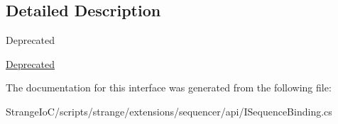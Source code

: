 \subsection{Detailed Description}
\begin{DoxyRefDesc}{Deprecated}
\item[\hyperlink{deprecated__deprecated000001}{Deprecated}]\end{DoxyRefDesc}


The documentation for this interface was generated from the following file\-:\begin{DoxyCompactItemize}
\item 
Strange\-Io\-C/scripts/strange/extensions/sequencer/api/I\-Sequence\-Binding.\-cs\end{DoxyCompactItemize}
